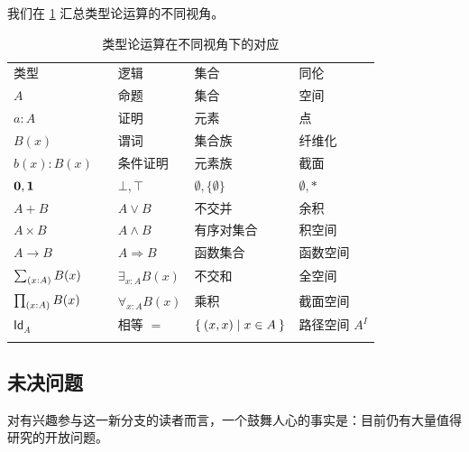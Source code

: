 我们在 \cref{tab:pov} 汇总类型论运算的不同视角。

\begin{table}[htb]
  \centering
  \OPTsmalltable
 \begin{tabular}{lllll}
    \toprule
       类型 && 逻辑 & 集合 & 同伦\\ \addlinespace[2pt]
    \midrule
       $A$ && 命题 & 集合 & 空间\\ \addlinespace[2pt]
       $a:A$ && 证明 & 元素 & 点 \\ \addlinespace[2pt]
       $B(x)$ && 谓词 & 集合族 & 纤维化 \\ \addlinespace[2pt]
       $b(x) : B(x)$ && 条件证明 & 元素族 & 截面\\ \addlinespace[2pt]
       $\mathbf{0}, \mathbf{1}$ && $\bot, \top$ & $\emptyset, \{ \emptyset \}$ & $\emptyset, *$\\ \addlinespace[2pt]
       $A + B$ && $A\vee B$ & 不交并 & 余积\\ \addlinespace[2pt]
       $A\times B$ && $A\wedge B$ & 有序对集合 & 积空间\\ \addlinespace[2pt]
       $A\to B$ && $A\Rightarrow B$ & 函数集合 & 函数空间\\ \addlinespace[2pt]
       $\sm{x:A}B(x)$ &&  $\exists_{x:A}B(x)$ & 不交和 & 全空间\\ \addlinespace[2pt]
       $\prd{x:A}B(x)$ &&  $\forall_{x:A}B(x)$ & 乘积 & 截面空间\\ \addlinespace[2pt]
       $\mathsf{Id}_{A}$ && 相等 $=$ & $\Set{{\mathopen{}(x,x)\mathclose{}} | x\in A}$ & 路径空间 $A^I$ \\ \addlinespace[2pt]
    \bottomrule
  \end{tabular}
  \caption{类型论运算在不同视角下的对应}\label{tab:pov}
\end{table}

%

\subsection*{未决问题}

%

对有兴趣参与这一新分支的读者而言，一个鼓舞人心的事实是：目前仍有大量值得研究的开放问题。

